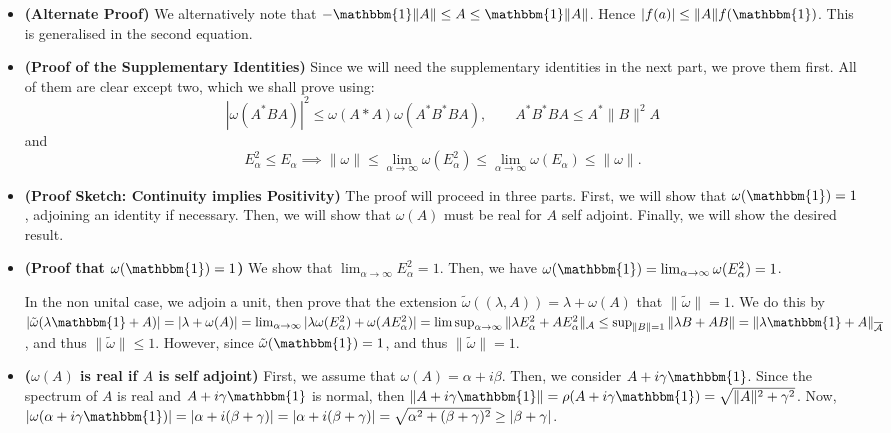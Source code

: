 \documentclass[twoside,symmetric, openany, 12pt]{./tuftebook}
\theoremstyle{definition}
\theoremstyle{definition}
\theoremstyle{definition}
\begin{document}
\begin{enumerate}
\begin{itemize}
				We choose a sequence of $\{A_n\}_n,~0\le A_n,~\|A_n\|\le 1$. If for all sequences $\lambda_n$ we have $\sum \lambda_n A_n\to A\ge 0$, then we also know $\sum_{n=1}^{N} \lambda_n\omega(A_n) \le \omega(A)<\infty$. This can only be true for all $\lambda_n$ if $\omega$ are uniformly bounded, i.e. $M_+=\sup_{\|A\|=1}\omega(A)<\infty$. By decomposition, $\|\omega\|<4M_+$.
			\item \textbf{(Alternate Proof)} We alternatively note that $-\mathbbm{1}\|A\|\le A \le \mathbbm{1}\|A\|$. Hence $|f(a)|\le \|A\|f(\mathbbm{1})$. This is generalised in the second equation.
			\item \textbf{(Proof of the Supplementary Identities)} Since we will need the supplementary identities in the next part, we prove them first. All of them are clear except two, which we shall prove using:
				\[
				|\omega(A^*BA)|^2 \le \omega(A*A)\omega(A^*B^*BA),\qquad A^*B^*BA \le A^* \|B\|^2 A
				\] 
				and
				\[
					E_\alpha^2\le E_\alpha \implies \|\omega\|\le \lim_{\alpha \to \infty} \omega(E_\alpha^2) \le \lim_{\alpha \to \infty} \omega(E_\alpha)\le \|\omega\|
				.\] 
			\item \textbf{(Proof Sketch: Continuity implies Positivity)} The proof will proceed in three parts. First, we will show that $\omega(\mathbbm{1})=1$, adjoining an identity if necessary. Then, we will show that $\omega(A)$ must be real for $A$ self adjoint. Finally, we will show the desired result.
			\item \textbf{(Proof that $\omega(\mathbbm{1})=1$)} We show that $\lim_{\alpha \to \infty} E_\alpha^2 = 1$. Then, we have $\omega(\mathbbm{1}) = \lim_{\alpha \to \infty} \omega(E_\alpha^2) = 1$.

				In the non unital case, we adjoin a unit, then prove that the extension $\tilde{\omega}((\lambda, A)) = \lambda + \omega(A)$ that $\|\tilde{\omega}\|=1$. We do this by $|\tilde{\omega}(\lambda\mathbbm{1}+A)| = |\lambda+\omega(A)| = \lim_{\alpha \to \infty} |\lambda\omega(E_\alpha^2)+\omega(AE_\alpha^2)| = \limsup_{\alpha\to\infty} \|\lambda E_\alpha^2 + AE_\alpha^2\|_{\mathcal{A}}\le \sup_{\|B\|=1}\|\lambda B + AB\|=\|\lambda\mathbbm{1}+A\|_{\overline{\mathcal{A}}}$, and thus $\|\tilde{\omega}\|\le 1$. However, since $\tilde{\omega}(\mathbbm{1})=1$, and thus $\|\tilde{\omega}\|=1$. 
			\item \textbf{($\omega(A)$ is real if $A$ is self adjoint)} First, we assume that $\omega(A) =\alpha + i\beta$. Then, we consider $A+i\gamma\mathbbm{1}$. Since the spectrum of $A$ is real and $A+i\gamma\mathbbm{1}$ is normal, then $\|A+i\gamma\mathbbm{1}\|=\rho(A+i\gamma\mathbbm{1})=\sqrt{\|A\|^2 + \gamma^2} $. Now, $|\omega(\alpha+i\gamma\mathbbm{1})|=|\alpha+i(\beta+\gamma)|=|\alpha+i(\beta+\gamma)|=\sqrt{\alpha^2 + (\beta+\gamma)^2} \ge |\beta + \gamma|$. 


\end{itemize}
\end{enumerate}
\end{document}
